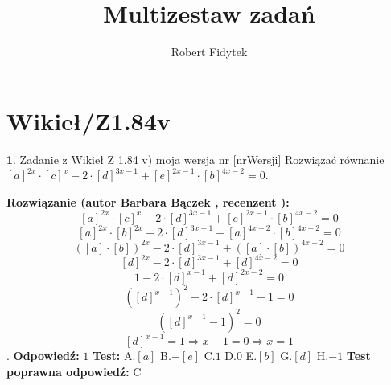 \documentclass[12pt, a4paper]{article}
\title{Multizestaw zadań}
\author{Robert Fidytek}
\date{}
\theoremstyle{definition} %
\newtheorem{zad}{}
\newcommand{\kategoria}[1]{\section{#1}} %
\newcommand{\zadStart}[1]{\begin{zad}#1\newline} %
\newcommand{\zadStop}{\end{zad}}   %
\newcommand{\rozwStart}[2]{\noindent \textbf{Rozwiązanie (autor #1 , recenzent #2): }\newline} %
\newcommand{\rozwStop}{\newline}                                            %
\newcommand{\odpStart}{\noindent \textbf{Odpowiedź:}\newline}    %
\newcommand{\odpStop}{\newline}                                             %
\newcommand{\testStart}{\noindent \textbf{Test:}\newline} %
\newcommand{\testStop}{\newline} %
\newcommand{\kluczStart}{\noindent \textbf{Test poprawna odpowiedź:}\newline} %
\newcommand{\kluczStop}{\newline} %
\begin{document}
\maketitle


\kategoria{Wikieł/Z1.84v}
\zadStart{Zadanie z Wikieł Z 1.84 v) moja wersja nr [nrWersji]}
Rozwiązać równanie $[a]^{2x} \cdot [c]^x -2 \cdot [d]^{3x-1} + [e]^{2x-1} \cdot [b]^{4x-2}=0$.
\zadStop
\rozwStart{Barbara Bączek}{}
$$[a]^{2x} \cdot [c]^x -2 \cdot [d]^{3x-1} + [e]^{2x-1} \cdot [b]^{4x-2}=0$$
$$[a]^{2x} \cdot [b]^{2x} -2 \cdot [d]^{3x-1} + [a]^{4x-2} \cdot [b]^{4x-2}=0$$
$${([a] \cdot [b])}^{2x} -2 \cdot [d]^{3x-1} + {([a] \cdot [b])}^{4x-2}=0$$
$$[d]^{2x} -2 \cdot [d]^{3x-1} + [d]^{4x-2}=0$$
$$1 -2 \cdot [d]^{x-1} + [d]^{2x-2}=0$$
$${([d]^{x-1})}^2 -2 \cdot [d]^{x-1} +1=0$$
$${([d]^{x-1}-1)}^2=0$$
$$[d]^{x-1}=1 \Rightarrow x-1=0 \Rightarrow x=1$$.
\rozwStop
\odpStart
$1$
\odpStop
\testStart
A.$[a]$
B.$-[e]$
C.$1$
D.$0$
E.$[b]$
G.$[d]$
H.$-1$
\testStop
\kluczStart
C
\kluczStop
\end{document}
